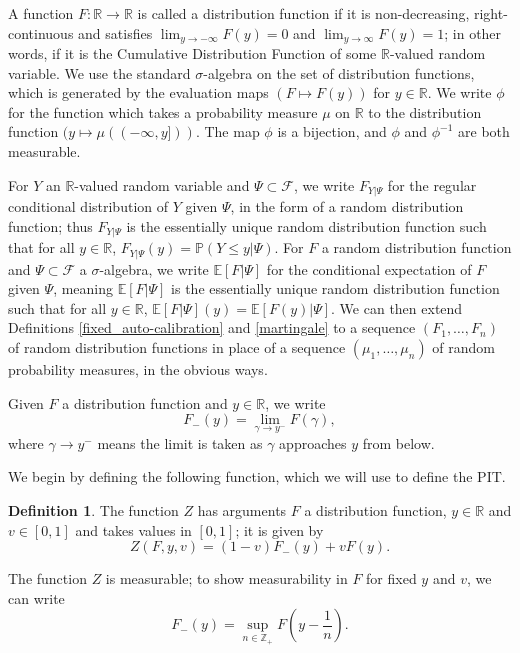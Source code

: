 \documentclass[aap]{imsart}
\theoremstyle{plain}
\theoremstyle{definition}
\newtheorem{definition}[theorem]{Definition}
\begin{document}
A function $F : \mathbb{R} \to \mathbb{R}$ is called a distribution function if it is non-decreasing, right-continuous and satisfies $\lim_{y \to -\infty} F(y) = 0$ and $\lim_{y \to \infty} F(y) = 1$; in other words, if it is the Cumulative Distribution Function of some $\mathbb{R}$-valued random variable. We use the standard $\sigma$-algebra on the set of distribution functions, which is generated by the evaluation maps $(F \mapsto F(y))$ for $y \in \mathbb{R}$. We write $\phi$ for the function which takes a probability measure $\mu$ on $\mathbb{R}$ to the distribution function $(y \mapsto \mu((-\infty, y]))$. The map $\phi$ is a bijection, and $\phi$ and $\phi^{-1}$ are both measurable.

For $Y$ an $\mathbb{R}$-valued random variable and $\Psi \subset \mathcal{F}$, we write $F_{Y|\Psi}$ for the regular conditional distribution of $Y$ given $\Psi$, in the form of a random distribution function; thus $F_{Y|\Psi}$ is the essentially unique random distribution function such that for all $y \in \mathbb{R}$, $F_{Y|\Psi}(y) = \mathbb{P}(Y \leq y|\Psi)$. For $F$ a random distribution function and $\Psi \subset \mathcal{F}$ a $\sigma$-algebra, we write $\mathbb{E}[F|\Psi]$ for the conditional expectation of $F$ given $\Psi$, meaning $\mathbb{E}[F|\Psi]$ is the essentially unique random distribution function such that for all $y \in \mathbb{R}$, $\mathbb{E}[F|\Psi](y) = \mathbb{E}[F(y)|\Psi]$. We can then extend Definitions \ref{fixed_auto-calibration} and \ref{martingale} to a sequence $(F_1, \ldots, F_n)$ of random distribution functions in place of a sequence $(\mu_1, \ldots, \mu_n)$ of random probability measures, in the obvious ways.

Given $F$ a distribution function and $y \in \mathbb{R}$, we write
\begin{equation*}
  F_-(y) = \lim_{\gamma \to y^-} F(\gamma),
\end{equation*}
where $\gamma \to y^-$ means the limit is taken as $\gamma$ approaches $y$ from below.

We begin by defining the following function, which we will use to define the PIT.
\begin{definition}
  The function $Z$ has arguments $F$ a distribution function, $y \in \mathbb{R}$ and $v \in [0,1]$ and takes values in $[0,1]$; it is given by
  \begin{equation*}
    Z(F, y, v) = (1-v) F_-(y) + v F(y).
  \end{equation*}
\end{definition}
The function $Z$ is measurable; to show measurability in $F$ for fixed $y$ and $v$, we can write
\begin{equation*}
  F_-(y) = \sup_{n \in \mathbb{Z}_+} F\left(y - \frac{1}{n}\right).
\end{equation*}
\end{document}
